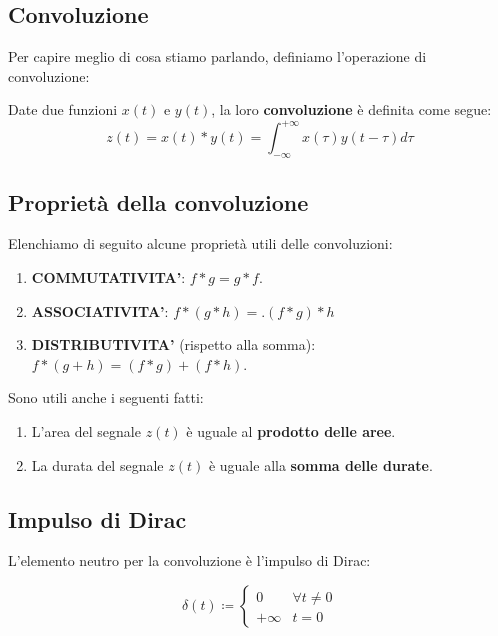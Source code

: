 \subsection{Convoluzione}

Per capire meglio di cosa stiamo parlando, definiamo l'operazione
di convoluzione:

\begin{definition}[CONVOLUZIONE]
    Date due funzioni $x(t)$ e $y(t)$, la loro \textbf{convoluzione} è
    definita come segue:
    \[
        z(t) = x(t) \ast y(t) = \int_{-\infty}^{+\infty} x(\tau )y(t-\tau )d\tau
    \] 
\end{definition}

\subsection{Proprietà della convoluzione}

Elenchiamo di seguito alcune proprietà utili delle convoluzioni:
\begin{enumerate}
    \item \textbf{COMMUTATIVITA'}: $f\ast g = g\ast f$.
    \item \textbf{ASSOCIATIVITA'}: $f\ast (g \ast h) = .(f\ast g)\ast h$
    \item \textbf{DISTRIBUTIVITA'} (rispetto alla somma): $f\ast (g+h) = (f\ast g) + (f\ast h)$.
\end{enumerate}

Sono utili anche i seguenti fatti:
\begin{enumerate}
    \item L'area del segnale $z(t)$ è uguale al \textbf{prodotto delle aree}.
    \item La durata del segnale $z(t)$ è uguale alla \textbf{somma delle durate}.
\end{enumerate}

\subsection{Impulso di Dirac}

L'elemento neutro per la convoluzione è l'impulso di Dirac:

\begin{definition}
    \[
        \delta(t) \coloneqq \begin{cases}
            0 & \forall t\ne 0 \\ 
            +\infty & t = 0
        \end{cases}
    \]
\end{definition}

